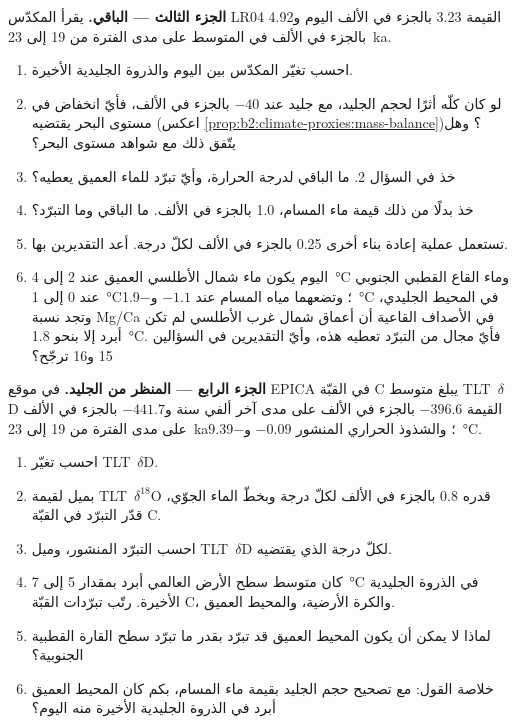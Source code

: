 \begin{problem}
\medskip\noindent\textbf{الجزء الثالث --- الباقي.}
يقرأ المكدّس LR04 القيمة \num{3.23} بالجزء في الألف اليوم و\num{4.92} بالجزء في الألف في المتوسط على مدى الفترة من 19 إلى
\qty{23}{ka}.
\begin{enumerate}[resume]
  \item احسب تغيّر المكدّس بين اليوم والذروة الجليدية الأخيرة.
  \item لو كان كلّه أثرًا لحجم الجليد، مع جليد عند $-40$ بالجزء في الألف، فأيّ انخفاض في مستوى البحر
        يقتضيه (اعكس \cref{prop:b2:climate-proxies:mass-balance})؟ وهل يتّفق ذلك مع
        شواهد مستوى البحر؟
  \item خذ  في السؤال 2. ما الباقي لدرجة الحرارة،
        وأيّ تبرّد للماء العميق يعطيه؟
  \item خذ بدلًا من ذلك قيمة ماء المسام، \num{1.0} بالجزء في الألف. ما الباقي وما التبرّد؟
  \item تستعمل عملية إعادة بناء أخرى \num{0.25} بالجزء في الألف لكلّ درجة. أعد التقديرين بها.
  \item اليوم يكون ماء شمال الأطلسي العميق عند 2 إلى \qty{4}{\celsius} وماء القاع
        القطبي الجنوبي عند 0 إلى \qty{1}{\celsius}؛ وتضعهما مياه المسام عند $-1.1$ و\qty{-1.9}{\celsius}
        في المحيط الجليدي، وتجد نسبة Mg/Ca في الأصداف القاعية أن أعماق شمال غرب الأطلسي
        لم تكن أبرد إلا بنحو \qty{1.8}{\celsius}. فأيّ مجال من التبرّد تعطيه هذه، وأيّ
        التقديرين في السؤالين 15 و16 ترجّح؟
\end{enumerate}

\medskip\noindent\textbf{الجزء الرابع --- المنظر من الجليد.}
في موقع EPICA في القبّة C يبلغ متوسط \mbox{\textdir TLT $\delta$D} القيمة $-396.6$ بالجزء في الألف على مدى آخر ألفي سنة
و$-441.7$ بالجزء في الألف على مدى الفترة من 19 إلى \qty{23}{ka}؛ والشذوذ الحراري المنشور $-0.09$
و\qty{-9.39}{\celsius}.
\begin{enumerate}[resume]
  \item احسب تغيّر \mbox{\textdir TLT $\delta$D}.
  \item بميل لقيمة \mbox{\textdir TLT $\delta^{18}$O} قدره \num{0.8} بالجزء في الألف لكلّ درجة وبخطّ الماء الجوّي،
        قدّر التبرّد في القبّة C.
  \item احسب التبرّد المنشور، وميل \mbox{\textdir TLT $\delta$D} لكلّ درجة الذي يقتضيه.
  \item كان متوسط سطح الأرض العالمي أبرد بمقدار 5 إلى \qty{7}{\celsius} في الذروة الجليدية الأخيرة.
        رتّب تبرّدات القبّة C، والكرة الأرضية، والمحيط العميق.
  \item لماذا لا يمكن أن يكون المحيط العميق قد تبرّد بقدر ما تبرّد سطح القارة القطبية الجنوبية؟
  \item خلاصة القول: مع تصحيح حجم الجليد بقيمة ماء المسام، بكم كان المحيط العميق
        أبرد في الذروة الجليدية الأخيرة منه اليوم؟
\end{enumerate}
\end{problem}

